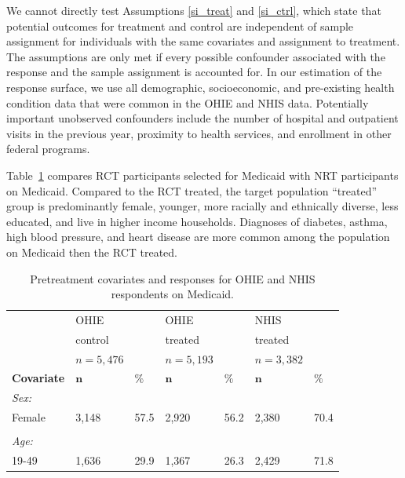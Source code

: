 \documentclass[hidelinks,12pt]{article}
\begin{document}
{We cannot directly test Assumptions \ref{si_treat} and \ref{si_ctrl}, which state that potential outcomes for treatment and control are independent of sample assignment for individuals with the same covariates and assignment to treatment. The assumptions are only met if every possible confounder associated with the response and the sample assignment is accounted for. In our estimation of the response surface, we use all demographic, socioeconomic, and pre-existing health condition data that were common in the OHIE and NHIS data. Potentially important unobserved confounders include the number of hospital and outpatient visits in the previous year, proximity to health services, and enrollment in other federal programs. 

Table~\ref{rct-nrt-compare} compares RCT participants selected for Medicaid with NRT participants on Medicaid. Compared to the RCT treated, the target population ``treated''  group is predominantly female, younger, more racially and ethnically diverse, less educated, and live in higher income households. Diagnoses of diabetes, asthma, high blood pressure, and heart disease are more common among the population on Medicaid then the RCT treated.

\begin{singlespace}
\begin{longtable}{lllllll}
\caption{Pretreatment covariates and responses for OHIE and NHIS respondents on Medicaid.\label{rct-nrt-compare}} \\
  & OHIE &  & OHIE &  & NHIS &  \\ 
    & control &  & treated &  &treated &   \\ 
  & $n=5,476$ &  & $n=5,193$ &  & $n=3,382$ &  \\  
  \hline   
    \hline   
 \textbf{Covariate} &  $\mathbf{n}$ & $\mathbf{\%}$ & $\mathbf{n}$ & $\mathbf{\%}$ & $\mathbf{n}$ & $\mathbf{\%}$ \\ 
\hline
\textit{Sex:} &  & & &  &  & \\ 

\hspace{3mm} Female & 3,148 & 57.5 & 2,920 & 56.2 & 2,380 & 70.4 \\ 
 &  & & &  &  & \\ 
\textit{Age:} &  & & &  &  & \\ 
\hspace{3mm}19-49 & 1,636 & 29.9 & 1,367 & 26.3 & 2,429 & 71.8  \\ 


\end{longtable}
\end{singlespace}}
\end{document}
